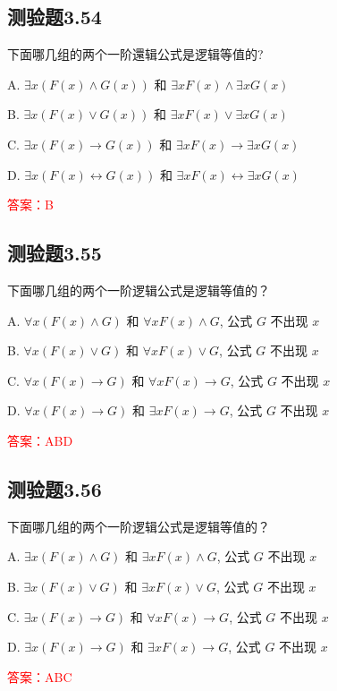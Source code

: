 \documentclass[UTF8, heading=true]{ctexart}
\begin{document}
\subsection{测验题3.54}

下面哪几组的两个一阶還辑公式是逻辑等值的?

A. $\exists x(F(x) \wedge G(x))$ 和 $\exists x F(x) \wedge \exists x G(x)$

B. $\exists x(F(x) \vee G(x))$ 和 $\exists x F(x) \vee \exists x G(x)$

C. $\exists x(F(x) \rightarrow G(x))$ 和 $\exists x F(x) \rightarrow \exists x G(x)$

D. $\exists x(F(x) \leftrightarrow G(x))$ 和 $\exists x F(x) \leftrightarrow \exists x G(x)$


\textcolor{red}{答案：B}

\subsection{测验题3.55}

下面哪几组的两个一阶逻辑公式是逻辑等值的？

A. $\forall x(F(x) \wedge G)$ 和 $\forall x F(x) \wedge G$, 公式 $G$ 不出现 $x$

B. $\forall x(F(x) \vee G)$ 和 $\forall x F(x) \vee G$, 公式 $G$ 不出现 $x$

C. $\forall x(F(x) \rightarrow G)$ 和 $\forall x F(x) \rightarrow G$, 公式 $G$ 不出现 $x$

D. $\forall x(F(x) \rightarrow G)$ 和 $\exists x F(x) \rightarrow G$, 公式 $G$ 不出现 $x$

\textcolor{red}{答案：ABD}

\subsection{测验题3.56}

下面哪几组的两个一阶逻辑公式是逻辑等值的？

A. $\exists x(F(x) \wedge G)$ 和 $\exists x F(x) \wedge G$, 公式 $G$ 不出现 $x$

B. $\exists x(F(x) \vee G)$ 和 $\exists x F(x) \vee G$, 公式 $G$ 不出现 $x$

C. $\exists x(F(x) \rightarrow G)$ 和 $\forall x F(x) \rightarrow G$, 公式 $G$ 不出现 $x$

D. $\exists x(F(x) \rightarrow G)$ 和 $\exists x F(x) \rightarrow G$, 公式 $G$ 不出现 $x$

\textcolor{red}{答案：ABC}
\end{document}
